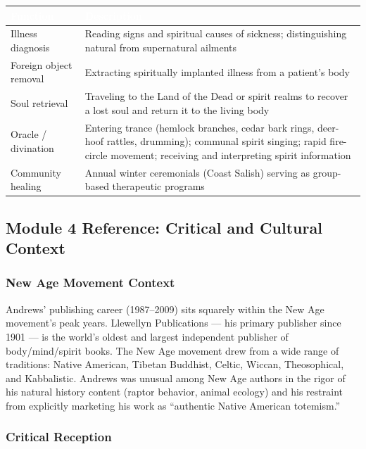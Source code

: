 \documentclass[11pt,letterpaper]{article}
\newcommand{\tableheader}[1]{\textbf{\sffamily\textcolor{white}{#1}}}
\begin{document}
\begin{center}
\begin{tabularx}{\textwidth}{L{3.5cm}X}
\toprule
{}
\tableheader{Function} & \tableheader{Description} \\
\midrule
Illness diagnosis & Reading signs and spiritual causes of sickness; distinguishing natural from supernatural ailments \\
Foreign object removal & Extracting spiritually implanted illness from a patient's body \\
Soul retrieval & Traveling to the Land of the Dead or spirit realms to recover a lost soul and return it to the living body \\
Oracle / divination & Entering trance (hemlock branches, cedar bark rings, deer-hoof rattles, drumming); communal spirit singing; rapid fire-circle movement; receiving and interpreting spirit information \\
Community healing & Annual winter ceremonials (Coast Salish) serving as group-based therapeutic programs \\
\bottomrule
\end{tabularx}
\end{center}

\subsection{Module 4 Reference: Critical and Cultural Context}

\subsubsection{New Age Movement Context}

Andrews' publishing career (1987--2009) sits squarely within the New Age movement's peak years. Llewellyn Publications --- his primary publisher since 1901 --- is the world's oldest and largest independent publisher of body/mind/spirit books. The New Age movement drew from a wide range of traditions: Native American, Tibetan Buddhist, Celtic, Wiccan, Theosophical, and Kabbalistic. Andrews was unusual among New Age authors in the rigor of his natural history content (raptor behavior, animal ecology) and his restraint from explicitly marketing his work as ``authentic Native American totemism.''

\subsubsection{Critical Reception}
\end{document}
